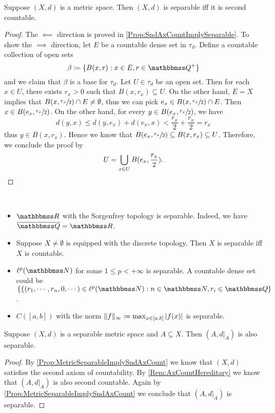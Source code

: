 \documentclass[screen,single]{techreport}
\numberwithin{equation}{section}
\begin{document}
\begin{proposition}\label{Prop:MetricSeparableImplySndAxCount}
	Suppose $(X,d)$ is a metric space.
	Then $(X,d)$ is separable iff it is second countable.
\end{proposition}
\begin{proof}
	The ${\impliedby}$ direction is proved in \cref{Prop:SndAxCountImplySeparable}.
	To show the ${\implies}$ direction, let $E$ be a countable dense set in $\tau_d$.
	Define a countable collection of open sets
	\[
	\beta \coloneqq \set{ B(x,r) : x \in E, r \in \bbQ^+}
	\]
	and we claim that $\beta$ is a base for $\tau_d$.
	Let $U \in \tau_d$ be an open set.
	Then for each $x \in U$, there exists $r_x > 0$ such that $B(x,r_x) \subseteq U$.
	On the other hand, $\overline{E} = X$ implies that $B(x,\sfrac{r_x}{2}) \cap E \neq \emptyset$, thus we can pick $e_x \in B(x,\sfrac{r_x}{2}) \cap E$.
	Then $x \in B(e_x,\sfrac{r_x}{2})$.
	On the other hand, for every $y \in B(e_x,\sfrac{r_x}{2})$, we have
	\[
	d(y,x) \le d(y,e_x) + d(e_x,x) < \frac{r_x}{2} + \frac{r_x}{2} = r_x
	\]
	thus $y \in B(x,r_x)$.
	Hence we know that $B(e_x,\sfrac{r_x}{2}) \subseteq B(x,r_x) \subseteq U$.
	Therefore, we conclude the proof by
	\[
	U = \bigcup_{x \in U} B({e_x, \frac{r_x}{2}}).
	\]
\end{proof}

\begin{example}\label{Exa:SeparableSpaces}\
	\begin{itemize}
		\item $\bbR$ with the Sorgenfrey topology is separable. Indeed, we have $\overline{\bbQ} = \bbR$.
		\item Suppose $X \neq \emptyset$ is equipped with the discrete topology.
		Then $X$ is separable iff $X$ is countable.
		\item $\ell^p(\bbN)$ for some $1 \le p < +\infty$ is separable.
		A countable dense set could be $\{  \{ (r_1,\cdots,r_n,0,\cdots) \in \ell^p(\bbN) : n \in \bbN, r_i \in \bbQ \}$.
		\item $C([a,b])$ with the norm $\|{f}\|_\infty \coloneqq \max_{x \in [a,b]} |{f(x)}|$ is separable.
	\end{itemize}
\end{example}

\begin{proposition}\label{Prop:SeparableMetricInduceSeparable}
	Suppose $(X,d)$ is a separable metric space and $A \subseteq X$.
	Then $(A,d|_A)$ is also separable.
\end{proposition}
\begin{proof}
	By \cref{Prop:MetricSeparableImplySndAxCount} we know that $(X,d)$ satisfies the second axiom of countability.
	By \cref{Rem:AxCountHereditary} we know that $(A,d|_A)$ is also second countable.
	Again by \cref{Prop:MetricSeparableImplySndAxCount} we conclude that $(A,d|_A)$ is separable.
\end{proof}
\end{document}
